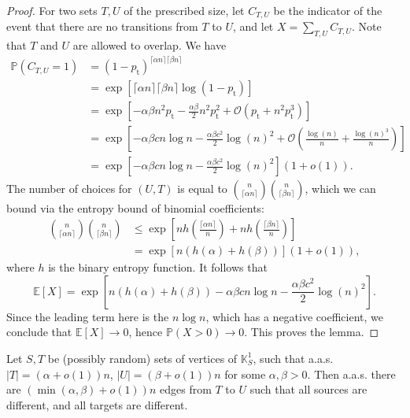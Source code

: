 \documentclass[runngingheads]{llncs}
\newcommand\recht\operatorname
\begin{document}
\begin{proof}
For two sets $T,U$ of the prescribed size, let $C_{T,U}$ be the indicator of the event that there are no transitions from $T$ to $U$, and let $X = \sum_{T,U} C_{T,U}$. Note that $T$ and $U$ are allowed to overlap. We have 
\begin{align*}
\mathbb{P}(C_{T,U} = 1) &= (1-p_{\recht{t}})^{\lceil \alpha n\rceil\lceil \beta n\rceil}\\
&= \operatorname{exp}\left[ \lceil\alpha n \rceil \lceil \beta n \rceil\log(1-p_{\recht{t}})\right]\\
&= \operatorname{exp}\left[-\alpha\beta n^2p_{\recht{t}} - \tfrac{\alpha\beta}{2}n^2p_{\recht{t}}^2  + \mathcal{O}(p_{\recht{t}}+n^2p_{\recht{t}}^3) \right]\\
&= \operatorname{exp}\left[-\alpha\beta c n \log n - \frac{\alpha \beta c^2}{2}\log(n)^2 + \mathcal{O}\left(\tfrac{\log(n)}{n}+\tfrac{\log(n)^3}{n}\right) \right]\\
&= \operatorname{exp}\left[-\alpha\beta c n \log n - \frac{\alpha \beta c^2}{2}\log(n)^2\right](1+o(1)).
\end{align*}
The number of choices for $(U,T)$ is equal to $\binom{n}{\lceil \alpha n\rceil}\binom{n}{\lceil \beta n\rceil}$, which we can bound via the entropy bound of binomial coefficients:
\begin{align*}
\binom{n}{\lceil \alpha n\rceil}\binom{n}{\lceil \beta n\rceil} &\leq \operatorname{exp}\left[nh\left(\tfrac{\lceil \alpha n\rceil}{n}\right)+nh\left(\tfrac{\lceil \beta n\rceil}{n}\right)\right]\\
&= \operatorname{exp}\left[n(h(\alpha)+h(\beta))\right](1+o(1)),
\end{align*}
where $h$ is the binary entropy function. It follows that 
\[
\mathbb{E}[X] = \operatorname{exp}\left[n(h(\alpha)+h(\beta))-\alpha\beta c n \log n - \frac{\alpha \beta c^2}{2}\log(n)^2\right].
\]
Since the leading term here is the $n \log n$, which has a negative coefficient, we conclude that $\mathbb{E}[X] \rightarrow 0$, hence $\mathbb{P}(X > 0) \rightarrow 0$. This proves the lemma.
\end{proof}

\begin{lemma} \label{lem:matching}
Let $S,T$ be (possibly random) sets of vertices of $\mathbb{K}^1_S$, such that a.a.s. $|T| = (\alpha + o(1))n$, $|U| = (\beta + o(1))n$ for some $\alpha,\beta > 0$. Then a.a.s. there are $(\min(\alpha,\beta)+o(1))n$ edges from $T$ to $U$ such that all sources are different, and all targets are different.
\end{lemma}
\end{document}
